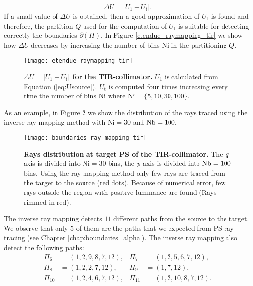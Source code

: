 \begin{equation}\label{eq:delta_raymapping}
\Delta U =  \big|U_1-U_{\textrm{t}}\big|.
\end{equation}
If a small value of $\Delta U$ is obtained, then a good approximation of $U_{\textrm{t}}$ is found and therefore, the partition $Q$ used for the computation of $U_{\textrm{t}}$ is suitable for detecting correctly the boundaries $\partial$$(\Pi)$. In Figure \ref{etendue_raymapping_tir} we show how $\Delta U$ decreases by increasing the number of bins $\textrm{Ni}$ in the partitioning $Q$.  
\begin{figure}[h]
  \begin{center}
  \texttt{[image: etendue\_raymapping\_tir]}
  \end{center}
  \caption{\textbf{$\Delta U = |U_1 - U_{\textrm{t}}|$ for the TIR-collimator.}
 $U_1$ is calculated from Equation (\ref{eq:Usource}). $U_{\textrm{t}}$ is computed four times increasing every time the number of bins $\textrm{Ni}$ where $\textrm{Ni}=\{5,10,30,100\}$. }
\label{fig:etendue_raymapping_tir}
 \end{figure}
As an example, in Figure \ref{fig:boundaries_TIR_ray_mapping} we show the distribution of the rays traced using the inverse ray mapping method with $\textrm{Ni}=30$ and $\textrm{Nb} = 100.$ 
\begin{figure}[h]
  \begin{center}
  \texttt{[image: boundaries\_ray\_mapping\_tir]}
  \end{center}
  \caption{\textbf{Rays distribution at target PS of the TIR-collimator.}
 The $\textit{q}$-axis is divided into $\textrm{Ni}=30$ bins, the $\textit{p}$-axis is divided into $\textrm{Nb} = 100$ bins. Using the ray mapping method only few rays are traced from the target to the source (red dots). Because of numerical error, few rays outside the region with positive luminance are found (Rays rimmed in red).}
\label{fig:boundaries_TIR_ray_mapping}
 \end{figure}
The inverse ray mapping detects $11$ different paths from the source to the target. 
We observe that only $5$ of them are the paths that we expected from PS ray tracing (see Chapter \ref{chap:boundaries_alpha}). 
The inverse ray mapping also detect the following paths:
\begin{equation}
\begin{array}{llll}
\Pi_6&=(1,2,9,8,7,12), & \Pi_7&=(1,2,5,6,7,12), \\
\Pi_8&=(1,2,2,7,12),& \Pi_9&=(1,7,12),\\
\Pi_{10}&=(1,2,4,6,7,12),& \Pi_{11}&=(1,2,10,8,7,12).
\end{array}\end{equation}
